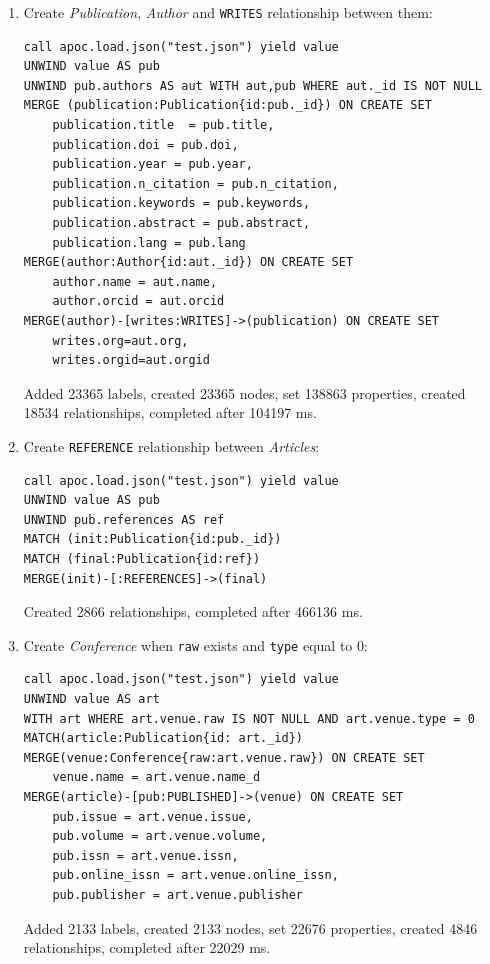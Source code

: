 \documentclass{Configuration_Files/PoliMi3i_thesis}
\begin{document}
\begin{enumerate}
    \item Create \emph{Publication}, \emph{Author} and \verb |WRITES| relationship between them:
        \begin{lstlisting}[language=cypher, label=lst:cypher-example]
call apoc.load.json("test.json") yield value
UNWIND value AS pub
UNWIND pub.authors AS aut WITH aut,pub WHERE aut._id IS NOT NULL
MERGE (publication:Publication{id:pub._id}) ON CREATE SET
    publication.title  = pub.title,
    publication.doi = pub.doi,
    publication.year = pub.year,
    publication.n_citation = pub.n_citation,
    publication.keywords = pub.keywords,
    publication.abstract = pub.abstract,
    publication.lang = pub.lang
MERGE(author:Author{id:aut._id}) ON CREATE SET
    author.name = aut.name,
    author.orcid = aut.orcid
MERGE(author)-[writes:WRITES]->(publication) ON CREATE SET
    writes.org=aut.org,
    writes.orgid=aut.orgid
        \end{lstlisting}
        Added 23365 labels, created 23365 nodes, set 138863 properties, created 18534 relationships, completed after 104197 ms.
    \item Create \verb |REFERENCE| relationship between \emph{Articles}:
        \begin{lstlisting}[language=cypher, label=lst:cypher-example]
call apoc.load.json("test.json") yield value
UNWIND value AS pub
UNWIND pub.references AS ref
MATCH (init:Publication{id:pub._id})
MATCH (final:Publication{id:ref})
MERGE(init)-[:REFERENCES]->(final)
        \end{lstlisting}
        Created 2866 relationships, completed after 466136 ms.
    \item Create \emph{Conference} when \verb |raw| exists and \verb |type| equal to 0:
        \begin{lstlisting}[language=cypher, label=lst:cypher-example]
call apoc.load.json("test.json") yield value
UNWIND value AS art
WITH art WHERE art.venue.raw IS NOT NULL AND art.venue.type = 0
MATCH(article:Publication{id: art._id})
MERGE(venue:Conference{raw:art.venue.raw}) ON CREATE SET
    venue.name = art.venue.name_d
MERGE(article)-[pub:PUBLISHED]->(venue) ON CREATE SET
    pub.issue = art.venue.issue,
    pub.volume = art.venue.volume,
    pub.issn = art.venue.issn,
    pub.online_issn = art.venue.online_issn,
    pub.publisher = art.venue.publisher
        \end{lstlisting}
        Added 2133 labels, created 2133 nodes, set 22676 properties, created 4846 relationships, completed after 22029 ms.

\end{enumerate}
\end{document}
